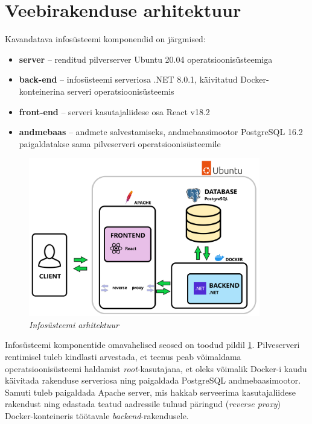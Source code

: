 \section{Veebirakenduse arhitektuur}
\label{chapters:analysis_architecture}
Kavandatava infosüsteemi komponendid on järgmised:
\begin{itemize}
    \item \textbf{server} -- renditud pilverserver Ubuntu 20.04 operatsioonisüsteemiga
    \item \textbf{back-end} -- infosüsteemi serveriosa .NET 8.0.1, käivitatud Docker-konteinerina serveri operatsioonisüsteemis
    \item \textbf{front-end} -- serveri kasutajaliidese osa React v18.2
    \item \textbf{andmebaas} -- andmete salvestamiseks, andmebaasimootor PostgreSQL 16.2 paigaldatakse sama pilveserveri operatsioonisüsteemile
\end{itemize}

\begin{figure}[ht]
    \centering
    \includegraphics[width=0.9\textwidth]{figures/analysis/architecture.png}
    \caption[Infosüsteemi arhitektuur]{\textit{Infosüsteemi arhitektuur}}
    \label{fig:architecture}
\end{figure}

Infosüsteemi komponentide omavahelised seosed on toodud pildil \ref{fig:architecture}.
Pilveserveri rentimisel tuleb kindlasti arvestada, et teenus peab võimaldama operatsioonisüsteemi
haldamist \textit{root}-kasutajana, et oleks võimalik Docker-i kaudu käivitada rakenduse serveriosa ning
paigaldada PostgreSQL andmebaasimootor. Samuti tuleb paigaldada Apache server, mis hakkab 
serveerima kasutajaliidese rakendust ning edastada teatud aadressile tulnud päringud (\textit{reverse proxy})
Docker-konteineris töötavale \textit{backend}-rakendusele.